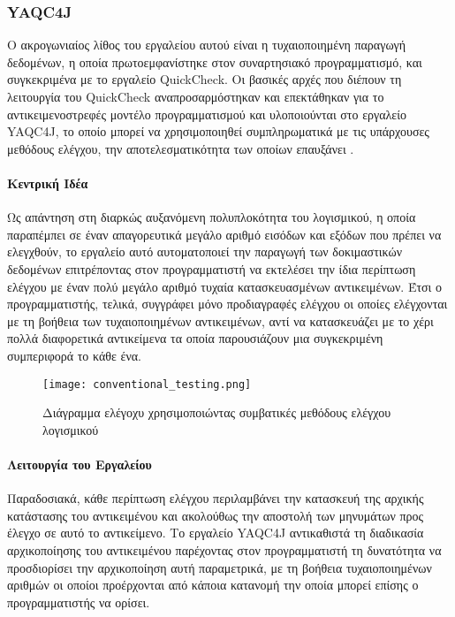 \documentclass[12pt]{article}
\begin{document}
\subsubsection{YAQC4J}

Ο ακρογωνιαίος λίθος του εργαλείου αυτού είναι η τυχαιοποιημένη παραγωγή δεδομένων, η οποία πρωτοεμφανίστηκε στον συναρτησιακό προγραμματισμό, και συγκεκριμένα με το εργαλείο QuickCheck. Οι βασικές αρχές που διέπουν τη λειτουργία του QuickCheck αναπροσαρμόστηκαν και επεκτάθηκαν για το αντικειμενοστρεφές μοντέλο προγραμματισμού και υλοποιούνται στο εργαλείο YAQC4J, το οποίο μπορεί να χρησιμοποιηθεί συμπληρωματικά με τις υπάρχουσες μεθόδους ελέγχου, την αποτελεσματικότητα των οποίων επαυξάνει \cite{andres}.

\paragraph{Κεντρική Ιδέα} Ως απάντηση στη διαρκώς αυξανόμενη πολυπλοκότητα του λογισμικού, η οποία παραπέμπει σε έναν απαγορευτικά μεγάλο αριθμό εισόδων και εξόδων που πρέπει να ελεγχθούν, το εργαλείο αυτό αυτοματοποιεί την παραγωγή των δοκιμαστικών δεδομένων επιτρέποντας στον προγραμματιστή να εκτελέσει την ίδια περίπτωση ελέγχου με έναν πολύ μεγάλο αριθμό τυχαία κατασκευασμένων αντικειμένων. Έτσι ο προγραμματιστής, τελικά, συγγράφει μόνο προδιαγραφές ελέγχου οι οποίες ελέγχονται με τη βοήθεια των τυχαιοποιημένων αντικειμένων, αντί να κατασκευάζει με το χέρι πολλά διαφορετικά αντικείμενα τα οποία παρουσιάζουν μια συγκεκριμένη συμπεριφορά το κάθε ένα.

\begin{wrapfigure}{r}{0.45\textwidth}
\centering
    \texttt{[image: conventional\_testing.png]}
    \caption{Διάγραμμα ελέγοχυ χρησιμοποιώντας συμβατικές μεθόδους ελέγχου λογισμικού}
    \label{fig:conventional_testing}
\end{wrapfigure}

\paragraph{Λειτουργία του Εργαλείου}

Παραδοσιακά, κάθε περίπτωση ελέγχου περιλαμβάνει την κατασκευή της αρχικής κατάστασης του αντικειμένου και ακολούθως την αποστολή των μηνυμάτων προς έλεγχο σε αυτό το αντικείμενο. Το εργαλείο YAQC4J αντικαθιστά τη διαδικασία αρχικοποίησης του αντικειμένου παρέχοντας στον προγραμματιστή τη δυνατότητα να προσδιορίσει την αρχικοποίηση αυτή παραμετρικά, με τη βοήθεια τυχαιοποιημένων αριθμών οι οποίοι προέρχονται από κάποια κατανομή την οποία μπορεί επίσης ο προγραμματιστής να ορίσει.
\end{document}
